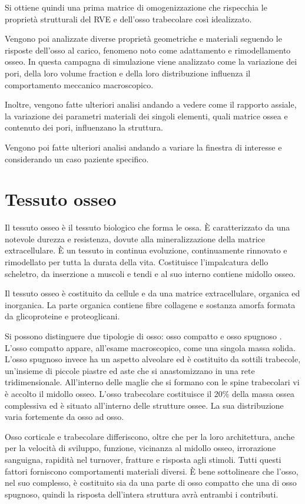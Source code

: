\documentclass[a4paper,num-refs]{oup-contemporary}
\begin{document}
Si ottiene quindi una prima matrice di omogenizzazione che rispecchia le proprietà strutturali del RVE e dell'osso trabecolare così idealizzato. 

Vengono poi analizzate diverse proprietà geometriche e materiali seguendo le risposte dell'osso al carico, fenomeno noto come adattamento e rimodellamento osseo. In questa campagna di simulazione viene analizzato come la variazione dei pori, della loro volume fraction e della loro distribuzione influenza il comportamento meccanico macroscopico. 

Inoltre, vengono fatte ulteriori analisi andando a vedere come il rapporto assiale, la variazione dei parametri materiali dei singoli elementi, quali matrice ossea e contenuto dei pori, influenzano la struttura. 

Vengono poi fatte ulteriori analisi andando a variare la finestra di interesse e considerando un caso paziente specifico.


\section{Tessuto osseo}

Il tessuto osseo è il tessuto biologico che forma le ossa. È caratterizzato da una notevole durezza e resistenza, dovute alla mineralizzazione della matrice extracellulare. È un tessuto in continua evoluzione, continuamente rinnovato e rimodellato per tutta la durata della vita. Costituisce l'impalcatura dello scheletro, da inserzione a muscoli e tendi e al suo interno contiene midollo osseo. 

Il tessuto osseo è costituito da cellule e da una matrice extracellulare, organica ed inorganica. La parte organica contiene fibre collagene e sostanza amorfa formata da glicoproteine e proteoglicani. 

Si possono distinguere due tipologie di osso: osso compatto e osso spugnoso \citep{Monesi}. 
L'osso compatto appare, all'esame macroscopico, come una singola massa solida. L'osso spugnoso invece ha un aspetto alveolare ed è costituito da sottili trabecole, un'insieme di piccole piastre ed aste che si anastomizzano in una rete tridimensionale. All'interno delle maglie che si formano con le spine trabecolari vi è accolto il midollo osseo. L'osso trabecolare costituisce il 20\% della massa ossea complessiva ed è situato all'interno delle strutture ossee. La sua distribuzione varia fortemente da osso ad osso. 

Osso corticale e trabecolare differiscono, oltre che per la loro architettura, anche per la velocità di sviluppo, funzione, vicinanza al midollo osseo, irrorazione sanguigna, rapidità nel turnover, fratture e risposta agli stimoli. Tutti questi fattori forniscono comportamenti materiali diversi. 
È bene sottolineare che l'osso, nel suo complesso, è costituito sia da una parte di osso compatto che una di osso spugnoso, quindi la risposta dell'intera struttura avrà entrambi i contributi. 
\end{document}
